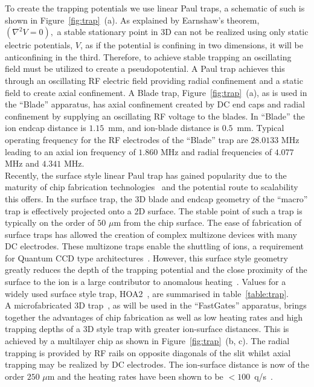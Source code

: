 \documentclass[12pt]{iopart}
\begin{document}
To create the trapping potentials we use linear
Paul traps, a schematic of such is shown in
Figure~\ref{fig:trap}~(a). As explained by Earnshaw's theorem,
$(\nabla^2 V = 0),$
a stable stationary point in 3D can not be realized using only static
electric potentials, $V$, as if the potential is confining in two
dimensions, it will be anticonfining in the third. Therefore, to
achieve stable trapping an oscillating field must be utilized to
create a pseudopotential.
A Paul trap achieves this through an oscillating RF electric field
providing radial confinement and a static field to create axial
confinement.
A Blade trap, Figure~\ref{fig:trap}~(a), as is used in the ``Blade''
apparatus, has axial confinement created by DC end caps and radial
confinement by supplying an oscillating RF voltage to the blades. In
``Blade'' the ion endcap distance is $1.15$~mm, and ion-blade distance
is $0.5$~mm. Typical operating frequency for the RF electrodes of the
``Blade'' trap are $28.0133$ MHz leading to an axial ion frequency of
$1.860$ MHz and radial frequencies of $4.077$ MHz and $4.341$
MHz.\\ Recently, the surface style linear Paul trap has gained
popularity due to the maturity of chip fabrication technologies~\cite{allcock_surface-electrode_2011}
and the potential route to scalability this offers. In the surface
trap, the 3D blade and endcap geometry of the ``macro'' trap is
effectively projected onto a 2D surface. The stable point of such a
trap is typically on the order of $50$ $\mu$m from the chip
surface. The ease of fabrication of surface traps has allowed the
creation of complex multizone devices with many DC electrodes.  These
multizone traps enable the shuttling of ions, a requirement for
Quantum CCD type architectures~\cite{kielpinski_architecture_2002}. However, this surface style
geometry greatly reduces the depth of the trapping potential and the
close proximity of the surface to the ion is a large contributor to
anomalous heating~\cite{turchette_heating_2000}. Values for a widely used surface style trap,
HOA2~\cite{maunz_high_2016}, are summarised in
table~\ref{table:trap}.\\ A microfabricated 3D
trap~\cite{see_fabrication_2013, wilpers_monolithic_2012}, as will be
used in the ``FastGates'' apparatus, brings together the advantages of
chip fabrication as well as low heating rates and high trapping depths
of a 3D style trap with greater ion-surface distances. This is
achieved by a multilayer chip as shown in Figure~\ref{fig:trap}~(b,
c). The radial trapping is provided by RF rails on opposite diagonals
of the slit whilst axial trapping may be realized by DC
electrodes. The ion-surface distance is now of the order $250$ $\mu$m
and the heating rates have been shown to be $<
100$~q/s~\cite{choonee_silicon_2017}.
\end{document}
